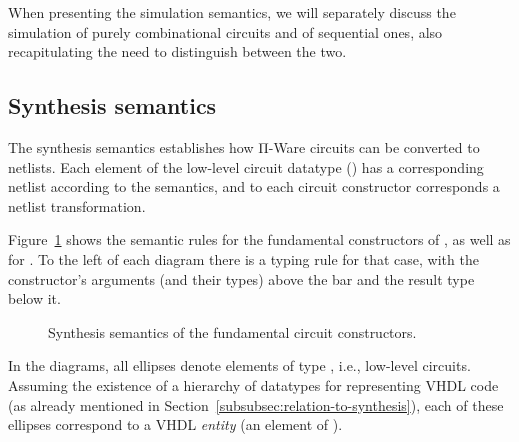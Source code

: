         When presenting the simulation semantics, we will separately discuss the simulation of
        purely combinational circuits and of sequential ones,
        also recapitulating the need to distinguish between the two.

        \subsection{Synthesis semantics}
        \label{subsec:synthesis-semantics}
            The synthesis semantics establishes how Π-Ware circuits can be converted to netlists.
            Each element of the low-level circuit datatype () has a corresponding netlist
            according to the semantics,
            and to each circuit constructor corresponds a netlist transformation.

            Figure~\ref{fig:semantics-syn-fundamental} shows the semantic rules for the
            fundamental constructors of , as well as for .
            To the left of each diagram there is a typing rule for that case,
            with the constructor's arguments (and their types) above the bar and the result type below it.


            \begin{figure}[h]
                \caption{Synthesis semantics of the fundamental circuit constructors.\label{fig:semantics-syn-fundamental}}
            \end{figure}

            In the diagrams, all ellipses denote elements of type , i.e., low-level circuits.
            Assuming the existence of a hierarchy of datatypes for representing \ac{VHDL} code
            (as already mentioned in Section~\ref{subsubsec:relation-to-synthesis}),
            each of these ellipses correspond to a \ac{VHDL} \emph{entity} (an element of ).

